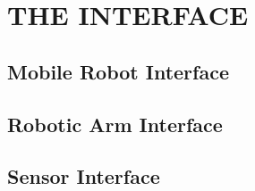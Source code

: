 \section*{THE INTERFACE}\label{s:interface}
\subsection*{Mobile Robot Interface}

\subsection*{Robotic Arm Interface}

\subsection*{Sensor Interface}